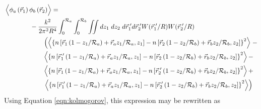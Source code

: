 \begin{equation}\label{eqn:prphase_n2}
\begin{aligned}
& \left\langle \vphantom{\hat{\phi}_{a}} \phi_{a}\left(\vec{r}_{1}\right) \phi_{b}\left(\vec{r}_{2}\right)\right\rangle = \\
&\quad\quad\quad\quad
-\frac{k^{2}}{2\pi^{2}R^{4}} \int_{0}^{\mathcal{R}_{a}}  \int_{0}^{\mathcal{R}_{b}} \iint dz_{1} \; dz_{2} \; d\vec{r}^{\;\prime}_{1}d\vec{r}^{\;\prime}_{2}  W(\vec{r}^{\;\prime}_{1}/R) W(\vec{r}^{\;\prime}_{2}/R)\\
&\quad\quad\quad\quad\quad\quad
\left(
\left\langle \left\{n\left[\vec{r}_{1}\left(1-z_{1}/\mathcal{R}_{a}\right) + \vec{r}_{a} z_{1}/\mathcal{R}_{a}, z_{1}\right] - 
 n\left[\vec{r}_{2}\left(1-z_{2}/\mathcal{R}_{b}\right) + \vec{r}_{b} z_{2}/\mathcal{R}_{b}, z_{2}\right] \right\}^{2} \right\rangle\right. - \\
&\quad\quad\quad\quad\quad\quad
\left\langle \left\{n\left[\vec{r}^{\;\prime}_{1}\left(1-z_{1}/\mathcal{R}_{a}\right) + \vec{r}_{a} z_{1}/\mathcal{R}_{a}, z_{1}\right] - 
 n\left[\vec{r}_{2}\left(1-z_{2}/\mathcal{R}_{b}\right) + \vec{r}_{b} z_{2}/\mathcal{R}_{b}, z_{2}\right] \right\}^{2} \right\rangle - \\
&\quad\quad\quad\quad\quad\quad
\left\langle \left\{n\left[\vec{r}_{1}\left(1-z_{1}/\mathcal{R}_{a}\right) + \vec{r}_{a} z_{1}/\mathcal{R}_{a}, z_{1}\right] - 
 n\left[\vec{r}^{\;\prime}_{2}\left(1-z_{2}/\mathcal{R}_{b}\right) + \vec{r}_{b} z_{2}/\mathcal{R}_{b}, z_{2}\right] \right\}^{2} \right\rangle + \\
&\quad\quad\quad\quad\quad\quad
\left.
\left\langle \left\{n\left[\vec{r}^{\;\prime}_{1}\left(1-z_{1}/\mathcal{R}_{a}\right) + \vec{r}_{a} z_{1}/\mathcal{R}_{a}, z_{1}\right] - 
 n\left[\vec{r}^{\;\prime}_{2}\left(1-z_{2}/\mathcal{R}_{b}\right) + \vec{r}_{b} z_{2}/\mathcal{R}_{b}, z_{2}\right] \right\}^{2} \right\rangle\right) \\
\end{aligned}
\end{equation}
Using Equation \ref{eqn:kolmogorov}, this expression may be rewritten as
